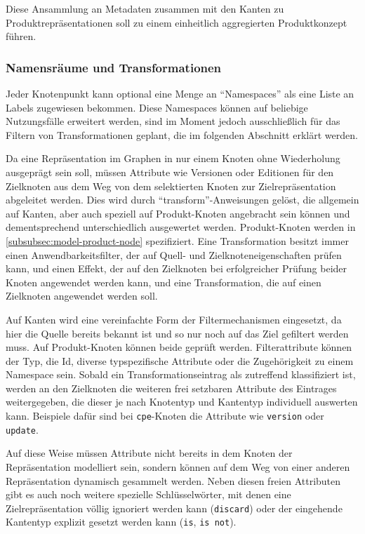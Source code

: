 Diese Ansammlung an Metadaten zusammen mit den Kanten zu Produktrepräsentationen soll zu einem einheitlich aggregierten Produktkonzept führen.

\subsubsection{Namensräume und Transformationen}\label{subsubsec:model-namespaces-transformations}

Jeder Knotenpunkt kann optional eine Menge an \enquote{Namespaces} als eine Liste an Labels zugewiesen bekommen.
Diese Namespaces können auf beliebige Nutzungsfälle erweitert werden, sind im Moment jedoch ausschließlich für das Filtern von Transformationen geplant, die im folgenden Abschnitt erklärt werden.

Da eine Repräsentation im Graphen in nur einem Knoten ohne Wiederholung ausgeprägt sein soll, müssen Attribute wie Versionen oder Editionen für den Zielknoten aus dem Weg von dem selektierten Knoten zur Zielrepräsentation abgeleitet werden.
Dies wird durch \enquote{transform}-Anweisungen gelöst, die allgemein auf Kanten, aber auch speziell auf Produkt-Knoten angebracht sein können und dementsprechend unterschiedlich ausgewertet werden.
Produkt-Knoten werden in \autoref{subsubsec:model-product-node} spezifiziert.
Eine Transformation besitzt immer einen Anwendbarkeitsfilter, der auf Quell- und Zielknoteneigenschaften prüfen kann, und einen Effekt, der auf den Zielknoten bei erfolgreicher Prüfung beider Knoten angewendet werden kann, und eine Transformation, die auf einen Zielknoten angewendet werden soll.

Auf Kanten wird eine vereinfachte Form der Filtermechanismen eingesetzt, da hier die Quelle bereits bekannt ist und so nur noch auf das Ziel gefiltert werden muss.
Auf Produkt-Knoten können beide geprüft werden.
Filterattribute können der Typ, die Id, diverse typspezifische Attribute oder die Zugehörigkeit zu einem Namespace sein.
Sobald ein Transformationseintrag als zutreffend klassifiziert ist, werden an den Zielknoten die weiteren frei setzbaren Attribute des Eintrages weitergegeben, die dieser je nach Knotentyp und Kantentyp individuell auswerten kann.
Beispiele dafür sind bei \texttt{cpe}-Knoten die Attribute wie \texttt{version} oder \texttt{update}.

Auf diese Weise müssen Attribute nicht bereits in dem Knoten der Repräsentation modelliert sein, sondern können auf dem Weg von einer anderen Repräsentation dynamisch gesammelt werden.
Neben diesen freien Attributen gibt es auch noch weitere spezielle Schlüsselwörter, mit denen eine Zielrepräsentation völlig ignoriert werden kann (\texttt{discard}) oder der eingehende Kantentyp explizit gesetzt werden kann (\texttt{is}, \texttt{is not}).

